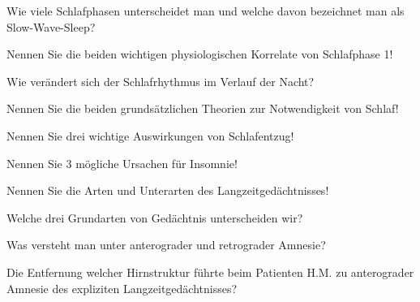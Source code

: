 \documentclass[10pt, a4paper]{exam}
\begin{document}
\begin{questions}
  \question Wie viele Schlafphasen unterscheidet man und welche davon bezeichnet man als Slow-Wave-Sleep?
  \begin{solution}

  \end{solution}

  \question Nennen Sie die beiden wichtigen physiologischen Korrelate von Schlafphase 1!
  \begin{solution}

  \end{solution}

  \question Wie verändert sich der Schlafrhythmus im Verlauf der Nacht?
  \begin{solution}

  \end{solution}

  \question Nennen Sie die beiden grundsätzlichen Theorien zur Notwendigkeit von Schlaf!
  \begin{solution}

  \end{solution}

  \question Nennen Sie drei wichtige Auswirkungen von Schlafentzug!
  \begin{solution}

  \end{solution}

  \question Nennen Sie 3 mögliche Ursachen für Insomnie!
  \begin{solution}

  \end{solution}

  \question Nennen Sie die Arten und Unterarten des Langzeitgedächtnisses!
  \begin{solution}

  \end{solution}

  \question Welche drei Grundarten von Gedächtnis unterscheiden wir?
  \begin{solution}

  \end{solution}

  \question Was versteht man unter anterograder und retrograder Amnesie?
  \begin{solution}

  \end{solution}

  \question Die Entfernung welcher Hirnstruktur führte beim Patienten H.M. zu anterograder Amnesie des expliziten Langzeitgedächtnisses?
  \begin{solution}


\end{solution}
\end{questions}
\end{document}
